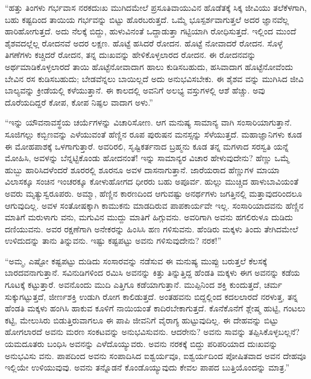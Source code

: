 “ಹತ್ತು ತಿಂಗಳು ಗರ್ಭವಾಸ ನರಕದುಃಖ ಮುಗಿದಮೇಲೆ ಪ್ರಸೂತಿವಾಯುವಿನ ಹೊಡೆತಕ್ಕೆ ಸಿಕ್ಕ ಜೀವಿಯು ತಲೆಕೆಳಗಾಗಿ, ಬಹು ಕಷ್ಟದಿಂದ ತಾಯಿಯ ಗರ್ಭವನ್ನು ಬಿಟ್ಟು ಹೊರಬರುತ್ತದೆ. ಒಮ್ಮೆ ಭೂಸ್ಪರ್ಶವಾಗುತ್ತಲೆ ಅದರ ಜ್ಞಾನವೆಲ್ಲ ಹಾರಿಹೋಗುತ್ತದೆ. ಅದು ನೆಲಕ್ಕೆ ಬಿದ್ದು, ಹುಳುವಿನಂತೆ ಒದ್ದಾಡುತ್ತಾ ಗಟ್ಟಿಯಾಗಿ ರೋಧಿಸುತ್ತದೆ. ಇಲ್ಲಿಂದ ಮುಂದೆ ಶೈಶವದಲ್ಲೆಲ್ಲ ರೋದನವೆ ಅದರ ಲಕ್ಷಣ. ಹೊಟ್ಟೆ ಹಸಿದರೆ ರೋದನ. ಹೊಟ್ಟೆ ನೋವಾದರೆ ರೋದನ. ಸೊಳ್ಳೆ ತಿಗಣೆಗಳು ಕಚ್ಚಿದರೆ ರೋದನ, ತನ್ನ ದುಃಖವನ್ನು ಹೇಳಿಕೊಳ್ಳಲಾರದ ರೋದನ. ಈ ರೋದನವನ್ನು ಅರ್ಥಮಾಡಿಕೊಳ್ಳಲಾರದೆ ತಾಯಿ ಹೊಟ್ಟೆನೋವಾದಾಗ ಹಾಲು ಕುಡಿಸಬಹುದು, ಹಸಿವಾದಾಗ ಹೊಟ್ಟೆನೋವೆಂದು ಬೇವಿನ ರಸ ಕುಡಿಸಬಹುದು; ಬೇಡವೆನ್ನಲು ಬಾಯಿಲ್ಲದೆ ಅದು ಅನುಭವಿಸಬೇಕು. ಈ ಶೈಶವ ವನ್ನು ಮುಗಿಸಿದ ಜೀವಿ ಬಾಲ್ಯವನ್ನು ಕ್ರೀಡೆಯಲ್ಲಿ ಕಳೆಯುತ್ತಾನೆ. ಈ ಕಾಲದಲ್ಲಿ ಅವನಿಗೆ ಅಲಭ್ಯ ವಸ್ತುಗಳಲ್ಲಿ ಆಶೆ ಹೆಚ್ಚು. ಅವು ದೊರೆಯದಿದ್ದರೆ ಕೋಪ, ಕೋಪ ನಿಷ್ಫಲ ವಾದಾಗ ಅಳು.”

“ಇನ್ನು ಯೌವನಾವಸ್ಥೆಯ ಚರ್ಯೆಗಳನ್ನು ವಿಚಾರಿಸೋಣ. ಆಗ ಮನುಷ್ಯ ಸಾಮಾನ್ಯ ವಾಗಿ ಸಂಸಾರಿಯಾಗುತ್ತಾನೆ. ಸೂಜಿಗಲ್ಲು ಕಬ್ಬಿಣವನ್ನು ಎಳೆಯುವಂತೆ ಹೆಣ್ಣಿನ ರೂಪ ಪುರುಷನ ಮನಸ್ಸನ್ನು ಸೆಳೆಯುತ್ತದೆ. ಮಹಾಜ್ಞಾನಿಗಳು ಕೂಡ ಈ ಮೋಹಪಾಶಕ್ಕೆ ಒಳಗಾಗುತ್ತಾರೆ. ಅವರಿರಲಿ, ಸೃಷ್ಟಿಕರ್ತನಾದ ಬ್ರಹ್ಮನು ಕೂಡ ತನ್ನ ಮಗಳಾದ ಸರಸ್ವತಿ ಯನ್ನೆ ಮೋಹಿಸಿ, ಅವಳನ್ನು ಬೆನ್ನಟ್ಟಿಕೊಂಡು ಹೋದನಂತೆ! ಇನ್ನು ಸಾಮಾನ್ಯರ ವಿಚಾರ ಹೇಳುವುದೇನು? ಹೆಣ್ಣು ಒಮ್ಮೆ ಹುಬ್ಬು ಹಾರಿಸಿದಳೆಂದರೆ ಶೂರರಲ್ಲಿ ಶೂರನೂ ಅವಳ ದಾಸನಾಗುತ್ತಾನೆ. ಜಾರೆಯರಾದ ಹೆಣ್ಣುಗಳ ಮಾಯಾ ವಿಲಾಸಕ್ಕೂ ಸಂಚಿನ ಇಂಚರಕ್ಕೂ ಕೋಳುಹೋಗದ ಧೀರರು ಬಹು ಅಪೂರ್ವ. ಹುಲ್ಲು ಮುಚ್ಚಿದ ಹಾಳುಬಾವಿಯಂತೆ ಅವರು ಮೃತ್ಯುಸ್ವರೂಪರು. ಅಮ್ಮಾ, ಹೆಣ್ಣಿನ ಕಾರಣದಿಂದ ಆಗುವಷ್ಟು ಅನರ್ಥಗಳು ಜಗತ್ತಿನಲ್ಲಿ ಮತ್ತಾವುದರಿಂದಲೂ ಆಗುವುದಿಲ್ಲ. ಅವಳ ಸಂತೋಷಕ್ಕಾಗಿ ಕಾಮುಕನು ಮಾಡದಿರುವ ಪಾಪಕಾರ್ಯವೇ ಇಲ್ಲ. ಸಂಸಾರಿಯಾದವನು ಹೆಣ್ಣಿನ ಮಾತಿಗೆ ಮರುಳಾಗು ವನು, ಮಗುವಿನ ಮುದ್ದು ಮಾತಿಗೆ ಹಿಗ್ಗುವನು. ಅವರಿಗಾಗಿ ಅವನು ಹಗಲಿರುಳೂ ದುಡಿದು ದಣಿಯುವನು. ಅವರ ರಕ್ಷಣೆಗಾಗಿ ಅನೇಕರನ್ನು ಹಿಂಸಿಸಿ ಹಣ ಗಳಿಸುವನು. ಹೆಂಡಿರು ಮಕ್ಕಳು ತಿಂದು ತೇಗಿದಮೇಲೆ ಉಳಿದುದನ್ನು ತಾನು ತಿನ್ನುವನು. ಇಷ್ಟು ಕಷ್ಟಪಟ್ಟು ಅವನು ಗಳಿಸುವುದೇನು? ನರಕ!”

“ಅಮ್ಮ, ಎಷ್ಟೋ ಕಷ್ಟಪಟ್ಟು ದುಡಿದು ಸಂಸಾರವನ್ನು ನಡೆಸುವ ಈ ಮನುಷ್ಯ ಮುಪ್ಪು ಬರುತ್ತಲೆ ಕೆಲಸಕ್ಕೆ ಬಾರದವನಾಗುತ್ತಾನೆ. ಸವಿನುಡಿಗಳಿಂದ ರಮಿಸಿ ಅವನನ್ನು ಕಿತ್ತು ತಿನ್ನುತ್ತಿದ್ದ ಹೆಂಡತಿ ಮಕ್ಕಳು ಈಗ ಅವನನ್ನು ಕಡೆಯ ಗೂಟಕ್ಕೆ ಕಟ್ಟುತ್ತಾರೆ. ಅವನೊಂದು ಮುದಿ ಎತ್ತಿಗೂ ಕಡೆಯಾಗುತ್ತಾನೆ. ಮುಪ್ಪಿನಿಂದ ಶಕ್ತಿ ಕುಂದುತ್ತದೆ, ಚರ್ಮ ಸುಕ್ಕುಗಟ್ಟುತ್ತದೆ, ಜೀರ್ಣಶಕ್ತಿ ಉಡುಗಿ ರೋಗ ಕಾಲಿಡುತ್ತದೆ. ಅಂತಹವನು ಬಿದ್ದಲ್ಲಿಂದ ಕದಲಲಾರದೆ ನರಳುತ್ತ, ತನ್ನ ಹೆಂಡತಿ ಮಕ್ಕಳು ಹಂಗಿಸಿ ಹಾಕುವ ಕೂಳಿಗೆ ನಾಯಿಯಂತೆ ಕಾದಿರಬೇಕಾಗುತ್ತದೆ. ಕೊನೆಕೊನೆಗೆ ಶ್ಲೇಷ್ಮ ಹುಟ್ಟಿ, ಗಂಟಲು ಕಟ್ಟಿ, ಮೇಲುಸಿರು ಬಿಡುತ್ತಿರುವಾಗಲೂ ಈ ಪಾಪಿ ಜೀವನಿಗೆ ವೈರಾಗ್ಯ ಹುಟ್ಟುವುದಿಲ್ಲ. ಈ ದೇಹವನ್ನು ಬಿಟ್ಟು ಹೋಗಲಾರದೆ ಅವನು ಮರಣ ಸಂಕಟವನ್ನು ಅನುಭವಿಸುವನು. ಆದರೇನು? ಅವನು ಸಾವನ್ನು ತಪ್ಪಿಸಿಕೊಳ್ಳಬಲ್ಲನೆ? ಯಮದೂತರು ಬಂಧಿಸಿ ಅವನನ್ನು ಎಳೆದೊಯ್ಯುವರು. ಅವನು ನರಕಕ್ಕೆ ಬಿದ್ದು ಪರಿಪರಿಯಾದ ದುಃಖವನ್ನು ಅನುಭವಿಸು ವನು. ಪಾಪದಿಂದ ಅವನು ಸಂಪಾದಿಸಿದ ಐಶ್ವರ್ಯವೂ, ಐಶ್ವರ್ಯದಿಂದ ಪೋಷಿತವಾದ ಅವನ ದೇಹವೂ ಇಲ್ಲಿಯೇ ಉಳಿಯುವುವು. ಅವನು ತನ್ನೊಡನೆ ಕೊಂಡೊಯ್ಯುವುದು ಕೇವಲ ಪಾಪದ ಬುತ್ತಿಯೊಂದನ್ನು ಮಾತ್ರ.”

